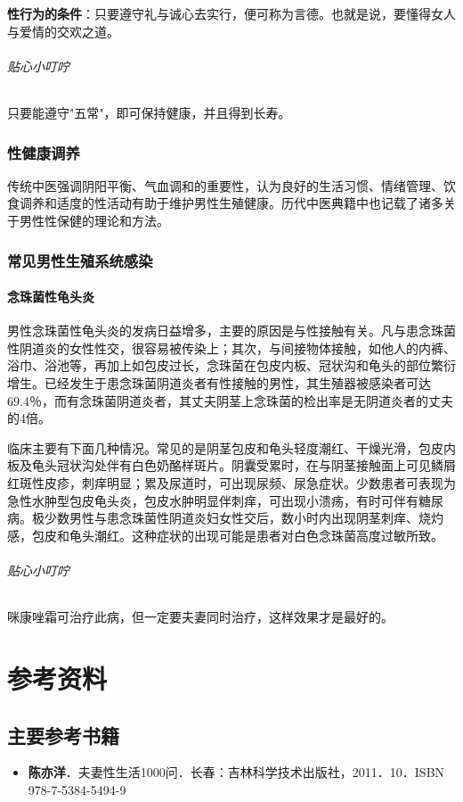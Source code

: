 \textbf{性行为的条件}：只要遵守礼与诚心去实行，便可称为言德。也就是说，要懂得女人与爱情的交欢之道。

\subparagraph{贴心小叮咛}

只要能遵守"五常"，即可保持健康，并且得到长寿。

\subsection{性健康调养}

传统中医强调阴阳平衡、气血调和的重要性，认为良好的生活习惯、情绪管理、饮食调养和适度的性活动有助于维护男性生殖健康。历代中医典籍中也记载了诸多关于男性性保健的理论和方法。

\subsection{常见男性生殖系统感染}

\subsubsection{念珠菌性龟头炎}

男性念珠菌性龟头炎的发病日益增多，主要的原因是与性接触有关。凡与患念珠菌性阴道炎的女性性交，很容易被传染上；其次，与间接物体接触，如他人的内裤、浴巾、浴池等，再加上如包皮过长，念珠菌在包皮内板、冠状沟和龟头的部位繁衍增生。已经发生于患念珠菌阴道炎者有性接触的男性，其生殖器被感染者可达69.4％，而有念珠菌阴道炎者，其丈夫阴茎上念珠菌的检出率是无阴道炎者的丈夫的4倍。

临床主要有下面几种情况。常见的是阴茎包皮和龟头轻度潮红、干燥光滑，包皮内板及龟头冠状沟处伴有白色奶酪样斑片。阴囊受累时，在与阴茎接触面上可见鳞屑红斑性皮疹，刺痒明显；累及尿道时，可出现尿频、尿急症状。少数患者可表现为急性水肿型包皮龟头炎，包皮水肿明显伴刺痒，可出现小溃疡，有时可伴有糖尿病。极少数男性与患念珠菌性阴道炎妇女性交后，数小时内出现阴茎刺痒、烧灼感，包皮和龟头潮红。这种症状的出现可能是患者对白色念珠菌高度过敏所致。

\subparagraph{贴心小叮咛}

咪康唑霜可治疗此病，但一定要夫妻同时治疗，这样效果才是最好的。

\chapter{参考资料}

\section{主要参考书籍}

\begin{itemize}
    \item \textbf{陈亦洋}．夫妻性生活1000问．长春：吉林科学技术出版社，2011．10．ISBN 978-7-5384-5494-9
\end{itemize}

